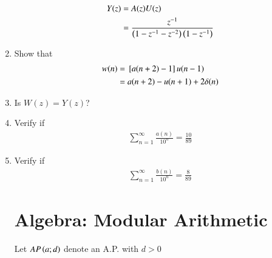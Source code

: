 \begin{enumerate}[label=\arabic*.,ref=\thesubsection.\theenumi]
\begin{align}
Y(z) &= A(z)U(z)
\\
&= \frac{z^{-1}}{\left(1- z^{-1}-z^{-2}\right)\left(1- z^{-1}\right)}
\end{align}
\item Show that 
\begin{align}
w(n)&={}\left[a(n+2)-1\right]u(n-1)
\\
&=a(n+2)-u(n+1)+2\delta(n)
\end{align}
\item Is $W(z)=Y(z)$?
\item Verify if 
\begin{align}
\sum_{n=1}^{\infty}\frac{a(n)}{10^n} = \frac{10}{89}
\end{align}
\item Verify if 
\begin{align}
\sum_{n=1}^{\infty}\frac{b(n)}{10^n} = \frac{8}{89}
\end{align}
\section{Algebra: Modular Arithmetic}
Let $AP\left(a;d\right)$ denote an A.P. with $d > 0$
\renewcommand{\theequation}{\theenumi}
\begin{enumerate}[label=\arabic*.,ref=\thesubsection.\theenumi]


\end{enumerate}
\end{enumerate}
